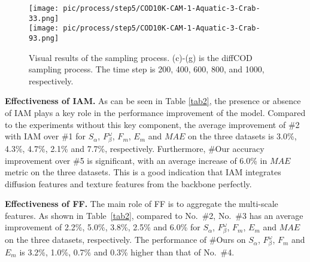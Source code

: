 \documentclass{ecai}
\begin{document}
\begin{figure*}[t]
{\begin{minipage}[t]{0.118\textwidth}
                \vspace{0.01\linewidth}
			\texttt{[image: pic/process/step5/COD10K-CAM-1-Aquatic-3-Crab-33.png]}\\
			\vspace{0.01\linewidth}
			\texttt{[image: pic/process/step5/COD10K-CAM-1-Aquatic-3-Crab-93.png]}\\
			\vspace{0.08\linewidth}
		\end{minipage}%
	}\hspace{0.03\columnwidth}
	\centering
        \caption{Visual results of the sampling process. (c)-(g) is the diffCOD sampling process. The time step is 200, 400, 600, 800, and 1000, respectively.}
        \label{fig4}
\end{figure*}


\vspace{4mm}
\noindent\textbf{Effectiveness of IAM.}
As can be seen in Table \ref{tab2}, the presence or absence of IAM plays a key role in the performance improvement of the model. Compared to the experiments without this key component, the average improvement of \#2 with IAM over \#1 for $S_{\alpha}$, $F_{\beta}^{\omega}$, $F_{m}$, $E_{m}$ and $MAE$ on the three datasets is 3.0\%, 4.3\%, 4.7\%, 2.1\% and 7.7\%, respectively. Furthermore, \#Our accuracy improvement over \#5 is significant, with an average increase of 6.0\% in $MAE$ metric on the three datasets. This is a good indication that IAM integrates diffusion features and texture features from the backbone perfectly. 





\vspace{5mm}
\noindent\textbf{Effectiveness of FF.} 
The main role of FF is to aggregate the multi-scale features. As shown in Table~\ref{tab2}, compared to No.~\#2, No.~\#3 has an average improvement of 2.2\%, 5.0\%, 3.8\%, 2.5\% and 6.0\% for $S_{\alpha}$, $F_{\beta}^{\omega}$, $F_{m}$, $E_{m}$ and $MAE$ on the three datasets, respectively. The performance of \#Ours on $S_{\alpha}$, $F_{\beta}^{\omega}$, $F_{m}$ and $E_{m}$ is 3.2\%, 1.0\%, 0.7\% and 0.3\% higher than that of No.~\#4.
\end{document}
